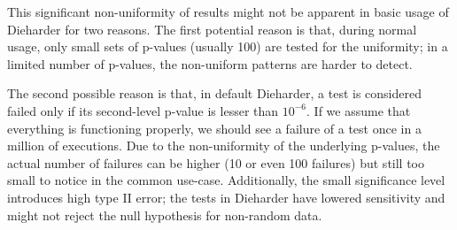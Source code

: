 \documentclass[
	digital,    %
	oneside,    %
	color,
	11pt,
	nocover,
	notable,
	nolof,
	nolot,
]{fithesis3}
\theoremstyle{definition}
\theoremstyle{remark}
\begin{document}
This significant non-uniformity of results might not be apparent in basic usage of Dieharder for two reasons. The first potential reason is that, during normal usage, only small sets of p-values (usually 100) are tested for the uniformity; in a limited number of p-values, the non-uniform patterns are harder to detect. 

The second possible reason is that, in default Dieharder, a test is considered failed only if its second-level p-value is lesser than $10^{-6}$. If we assume that everything is functioning properly, we should see a failure of a test once in a million of executions. Due to the non-uniformity of the underlying p-values, the actual number of failures can be higher (10 or even 100 failures) but still too small to notice in the common use-case. Additionally, the small significance level introduces high type II error; the tests in Dieharder have lowered sensitivity and might not reject the null hypothesis for non-random data.
\end{document}
